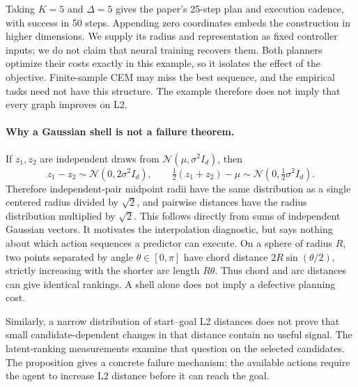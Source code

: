 \documentclass{article}
\theoremstyle{definition}
\theoremstyle{remark}
\begin{document}
Taking $K=5$ and $\Delta=5$ gives the paper's 25-step plan and execution cadence,
with success in 50 steps. Appending zero coordinates embeds the construction in higher
dimensions. We supply its radius and representation as fixed controller inputs;
we do not claim that neural training recovers them. Both planners optimize their
costs exactly in this example, so it isolates the effect of the objective.
Finite-sample CEM may miss the best sequence, and the empirical tasks need not have
this structure. The example therefore does not imply that every graph improves on L2.

\paragraph{Why a Gaussian shell is not a failure theorem.}
If $z_1,z_2$ are independent draws from $\mathcal N(\mu,\sigma^2I_d)$, then
\[
 z_1-z_2\sim\mathcal N(0,2\sigma^2I_d),\qquad
 \tfrac12(z_1+z_2)-\mu\sim\mathcal N(0,\tfrac12\sigma^2I_d).
\]
Therefore independent-pair midpoint radii have the same distribution as a single
centered radius divided by $\sqrt2$, and pairwise distances have the radius
distribution multiplied by $\sqrt2$. This follows directly from sums of independent
Gaussian vectors. It motivates the interpolation diagnostic, but says nothing
about which action sequences a predictor can execute.
On a sphere of radius $R$, two points separated by angle $\theta\in[0,\pi]$ have
chord distance $2R\sin(\theta/2)$, strictly increasing with the shorter arc length
$R\theta$. Thus chord and arc distances can give identical rankings.
A shell alone does not imply a defective planning cost.

Similarly, a narrow distribution of start--goal L2 distances does not prove that
small candidate-dependent changes in that distance contain no useful signal.
The latent-ranking measurements examine that question on the selected candidates.
The proposition gives a concrete failure mechanism: the available actions require
the agent to increase L2 distance before it can reach the goal.
\end{document}
